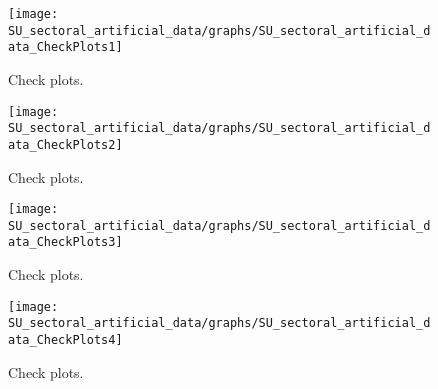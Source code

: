 
\begin{figure}[H]
\centering 
\texttt{[image: SU\_sectoral\_artificial\_data/graphs/SU\_sectoral\_artificial\_data\_CheckPlots1]}
\caption{Check plots.}\label{Fig:CheckPlots:1}
\end{figure}
 
\begin{figure}[H]
\centering 
\texttt{[image: SU\_sectoral\_artificial\_data/graphs/SU\_sectoral\_artificial\_data\_CheckPlots2]}
\caption{Check plots.}\label{Fig:CheckPlots:2}
\end{figure}
 
\begin{figure}[H]
\centering 
\texttt{[image: SU\_sectoral\_artificial\_data/graphs/SU\_sectoral\_artificial\_data\_CheckPlots3]}
\caption{Check plots.}\label{Fig:CheckPlots:3}
\end{figure}
 
\begin{figure}[H]
\centering 
\texttt{[image: SU\_sectoral\_artificial\_data/graphs/SU\_sectoral\_artificial\_data\_CheckPlots4]}
\caption{Check plots.}\label{Fig:CheckPlots:4}
\end{figure}
 
